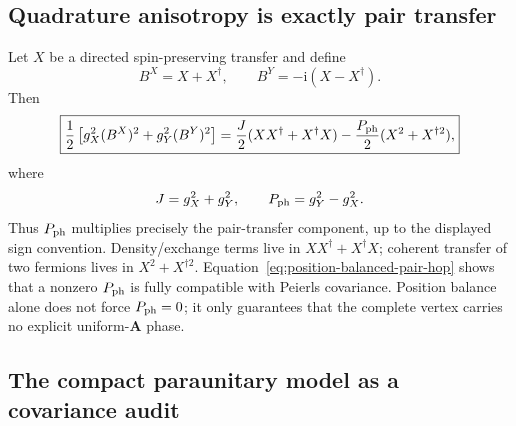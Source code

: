 \documentclass[11pt]{article}
\theoremstyle{remark}
\newcommand{\I}{\mathrm i}
\begin{document}
\subsection{Quadrature anisotropy is exactly pair transfer}

Let $X$ be a directed spin-preserving transfer and define
\begin{equation}
 B^X=X+X^\dagger,
 \qquad
 B^Y=-\I(X-X^\dagger).
\end{equation}
Then
\begin{equation}
 \boxed{
 \frac12\left[g_X^2(B^X)^2+g_Y^2(B^Y)^2\right]
 =\frac J2(XX^\dagger+X^\dagger X)
 -\frac{P_{\rm ph}}2(X^2+X^{\dagger2}),}
 \label{eq:quadrature-pair-transfer}
\end{equation}
where
\begin{equation}
 J=g_X^2+g_Y^2,
 \qquad
 P_{\rm ph}=g_Y^2-g_X^2.
 \label{eq:J-Pph-corrected}
\end{equation}
Thus $P_{\rm ph}$ multiplies precisely the pair-transfer component, up to the displayed sign convention.  Density/exchange terms live in $XX^\dagger+X^\dagger X$; coherent transfer of two fermions lives in $X^2+X^{\dagger2}$.  Equation~\eqref{eq:position-balanced-pair-hop} shows that a nonzero $P_{\rm ph}$ is fully compatible with Peierls covariance.  Position balance alone does not force $P_{\rm ph}=0$; it only guarantees that the complete vertex carries no explicit uniform-$\bm A$ phase.

\subsection{The compact paraunitary model as a covariance audit}
\end{document}
